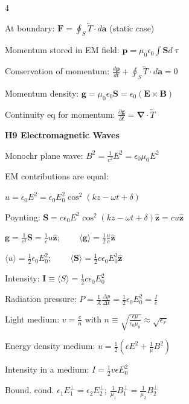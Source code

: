 \documentclass[a4paper,twoside]{article}
\newcommand{\secblock}[1]{%
\par\vspace{1.8pt}%
\noindent\colorbox{hdrcol}{\parbox[c][1.0em][c]{0.98\linewidth}{\color{white}\bfseries\small #1}}\par
\vspace{1pt}%
}
\begin{document}
\begin{multicols*}{4}

At boundary:
\(\bm F = \oint _S \overleftrightarrow{T} \cdot d\bm a\) (static case)


Momentum stored in EM field:
\(\bm p = \mu_0 \epsilon_0 \int \bm S d\uptau  \)

Conservation of momentum:
\(\frac{d\bm p}{dt} + \oint_S \overleftrightarrow{T} \cdot d\bm a = 0\)

Momentum density:
\(\bm g =  \mu_0 \epsilon_0 \bm S = \epsilon_0 (\bm E \times \bm B)\)


Continuity eq for momentum:
\(\frac{\partial \bm g}{\partial t} = \bm \nabla \cdot \overleftrightarrow{T} \)


\secblock{H9 Electromagnetic Waves}


Monochr plane wave:
\(B^2 = \frac{1}{c^2} E^2 = \epsilon_0 \mu_0 E^2\)

EM contributions are equal:

\(u = \epsilon_0 E^2 = \epsilon_0 E_0^2 \cos^2(k z - \omega t + \delta)\)

Poynting:
\(\bm S = c \epsilon_0 E^2 \cos^2(k z - \omega t + \delta) \hat{\bm z} = c u \hat{\bm z}\)

\(\bm g = \frac{1}{c^2} \bm S = \frac{1}{c} u \hat{\bm z}\);
\(\qquad \langle \bm g \rangle = \frac{1}{2} \frac{u}{c} \hat{\bm z}\)

\(\langle u \rangle = \frac{1}{2} \epsilon_0 E_0^2\);
\(\qquad \langle \bm S \rangle = \frac{1}{2} c \epsilon_0 E_0^2 \hat{\bm z}\)

Intensity: \(\bm I \equiv \langle  S \rangle = \frac{1}{2} c \epsilon_0 E_0^2 \)

Radiation pressure:
\(P = \frac{1}{A}\frac{\Delta p}{\Delta t} = \frac{1}{2}\epsilon_0 E_0^2 =\frac{I}{c}\)

Light medium:
\(v = \frac{c}{n}\)
with \(n \equiv \sqrt{\frac{\epsilon \mu}{\epsilon_0 \mu_0}} \approx \sqrt{\epsilon_r}\)

Energy density medium:
\(u = \frac{1}{2} (\epsilon E^2 + \frac{1}{\mu} B^2)\)

Intensity in a medium:
\(I = \frac{1}{2} v \epsilon E_0^2 \)

Bound. cond.
\(\epsilon_1 E_1^{\perp} = \epsilon_2 E_2^{\perp}\);
\(\frac{1}{\mu_1} B_1^{\perp} = \frac{1}{\mu_2} B_2^{\perp}\)


\end{multicols*}
\end{document}
